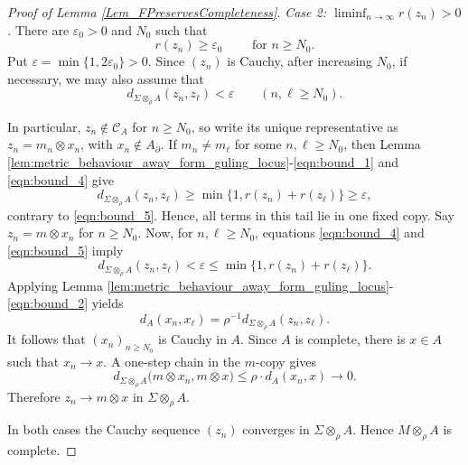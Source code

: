 \documentclass{sn-jnl}%
\theoremstyle{thmstyleone}%
\theoremstyle{thmstyletwo}%
\theoremstyle{thmstylethree}%
\newcommand{\M}{\Sigma}
\newcommand{\Fw}{\M\otimes_{\w}}
\newcommand{\dqm}[1]{d_{\M \otimes_{\w} #1}}
\newcommand{\w}{\rho}
\begin{document}
\begin{appendices}
\begin{proof}[Proof of Lemma \ref{Lem_FPreservesCompleteness}]
\smallskip
\noindent\emph{Case 2: $\liminf_{n\to\infty}r(z_n)>0$.}
There are $\varepsilon_0>0$ and $N_0$ such that
\begin{equation}
   r(z_n)\geq\varepsilon_0    \qquad \text{ for } n\geq N_0.
\label{eqn:bound_4}
\end{equation}
Put $\varepsilon=\min\{1,2\varepsilon_0\}>0$. Since $(z_n)$ is Cauchy, after increasing $N_0$, if necessary, we may also assume that
\begin{equation}  
    \dqm{A}(z_n,z_\ell)<\varepsilon \qquad(n,\ell\geq N_0).
\label{eqn:bound_5}
\end{equation}

In particular, $z_n\notin \mathcal C_A$ for $n\geq N_0$, so write its unique representative as $ z_n=m_n\otimes x_n$, with $x_n\notin A_{\partial}$. If $m_n\neq m_\ell$ for some $n,\ell\geq N_0$, then Lemma \ref{lem:metric_behaviour_away_form_guling_locus}-\eqref{eqn:bound_1} and \eqref{eqn:bound_4} give
\begin{equation} \nonumber
   \dqm{A}(z_n,z_\ell)  \geq\min\{1,r(z_n)+r(z_\ell)\} \geq\varepsilon,
\end{equation}
contrary to \eqref{eqn:bound_5}.  Hence, all terms in this tail lie in one fixed copy. Say $z_n=m\otimes x_n$ for $n\geq N_0$. Now, for $n,\ell\geq N_0$, equations \eqref{eqn:bound_4} and \eqref{eqn:bound_5} imply
\begin{equation} 
\nonumber
   \dqm{A}(z_n,z_\ell) <\varepsilon \leq\min\{1,r(z_n)+r(z_\ell)\}.
\end{equation}
Applying Lemma \ref{lem:metric_behaviour_away_form_guling_locus}-\eqref{eqn:bound_2} yields
\begin{equation} \nonumber
   d_A(x_n,x_\ell)=\rho^{-1}d_{\Fw A}(z_n,z_\ell).
\end{equation}
It follows that $(x_n)_{n\geq N_0}$ is Cauchy in $A$.  Since $A$ is complete, there is $x\in A$ such that $x_n\to x$.  A one-step chain in the $m$-copy gives
\begin{equation} \nonumber
   \dqm{A}\bigl(m\otimes x_n,m\otimes x\bigr) \leq\rho \cdot d_A(x_n,x)\longrightarrow0.
\end{equation}
Therefore $z_n\to m\otimes x$ in ${\Fw A}$.

In both cases the Cauchy sequence $(z_n)$ converges in $\Fw A$.  Hence
$M\otimes_\rho A$ is complete.
\end{proof}
\end{appendices}



\end{document}

